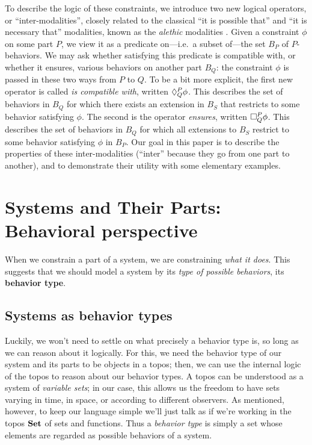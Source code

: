 To describe the logic of these constraints, we introduce two new logical operators, or ``inter-modalities'', closely related to the classical ``it is possible that'' and ``it is necessary that'' modalities, known as the \emph{alethic} modalities \cite{kripke1963semantical}. Given a constraint $\phi$ on some part $P$, we view it as a predicate on---i.e.\ a subset of---the set $B_P$ of $P$-behaviors. We may ask whether satisfying this predicate is compatible with, or whether it ensures, various behaviors on another part $B_Q$: the constraint $\phi$ is passed in these two ways  from $P$ to $Q$.  To be a bit more explicit, the first new operator is called \emph{is compatible with}, written $\compat{P}{Q}\phi$. This describes the set of behaviors in $B_Q$ for which there exists an extension in $B_S$ that restricts to some behavior satisfying $\phi$. The second is the operator \emph{ensures}, written $\ensure{P}{Q}\phi$. This describes the set of behaviors in $B_Q$ for which all extensions to $B_S$ restrict to some behavior satisfying $\phi$ in $B_P$. Our goal in this paper is to describe the properties of these inter-modalities (``inter'' because they go from one part to another), and to demonstrate their utility with some elementary examples.

\section{Systems and Their Parts: Behavioral perspective}

When we constrain a part of a system, we are constraining \emph{what it does}. This suggests that we should model a system by its \emph{type of possible behaviors}, its \textbf{behavior type}.

\subsection{Systems as behavior types}

Luckily, we won't need to settle on what precisely a behavior type is, so long as we can reason about it logically. For this, we need the behavior type of our system and its parts to be objects in a topos; then, we can use the internal logic of the topos to reason about our behavior types. A topos can be understood as a system of \emph{variable sets}; in our case, this allows us the freedom to have sets varying in time, in space, or according to different observers. As mentioned, however, to keep our language simple we'll just talk as if we're working in the topos $\Set$ of sets and functions. Thus a \emph{behavior type} is simply a set whose elements are regarded as possible behaviors of a system.


